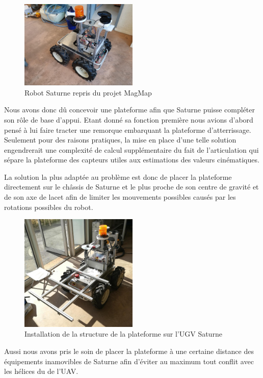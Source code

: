 \begin{figure}[H]
    \centering\includegraphics[width=0.5\textwidth]{images/ugv/ugv1.jpg}
    \caption{Robot Saturne repris du projet MagMap \cite{magmap}}
\end{figure}

Nous avons donc dû concevoir une plateforme afin que Saturne puisse compléter son rôle de base d’appui. Etant donné sa fonction première nous avions d’abord pensé à lui faire tracter une remorque embarquant la plateforme d’atterrissage. Seulement pour des raisons pratiques, la mise en place d’une telle solution engendrerait une complexité de calcul supplémentaire du fait de l’articulation qui sépare la plateforme des capteurs utiles aux estimations des valeurs cinématiques.

La solution la plus adaptée au problème est donc de placer la plateforme directement sur le châssis de Saturne et le plus proche de son centre de gravité et de son axe de lacet afin de limiter les mouvements possibles causés par les rotations possibles du robot.

\begin{figure}[H]
    \centering\includegraphics[width=0.5\textwidth]{images/ugv/ugv2.jpg}
    \caption{Installation de la structure de la plateforme sur l'UGV Saturne}
\end{figure}

Aussi nous avons pris le soin de placer la plateforme à une certaine distance des équipements inamovibles de Saturne afin d’éviter au maximum tout conflit avec les hélices du de l’UAV.

